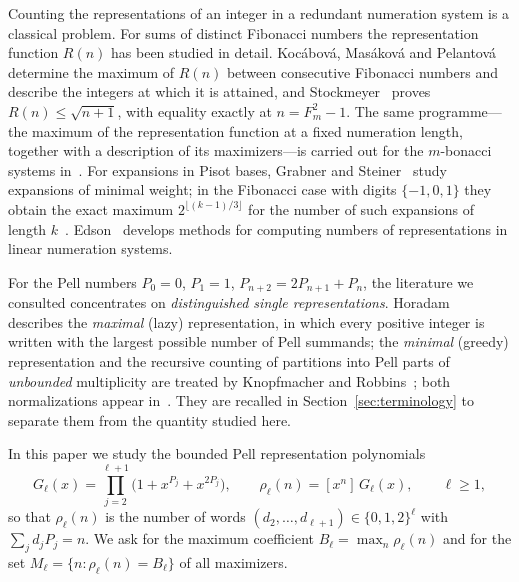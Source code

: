 \documentclass[11pt]{amsart}
\theoremstyle{definition}
\theoremstyle{remark}
\theoremstyle{plain}
\numberwithin{equation}{section}
\newcommand{\floor}[1]{\lfloor #1\rfloor}
\begin{document}
Counting the representations of an integer in a redundant numeration system is a classical problem.
For sums of distinct Fibonacci numbers the representation function $R(n)$ has been studied in
detail. Koc\'abov\'a, Mas\'akov\'a and Pelantov\'a~\cite{KMP2005} determine the maximum of $R(n)$
between consecutive Fibonacci numbers and describe the integers at which it is attained, and
Stockmeyer~\cite{Stockmeyer2009} proves $R(n)\le\sqrt{n+1}$, with equality exactly at
$n=F_m^2-1$. The same programme---the maximum of the representation function at a fixed numeration
length, together with a description of its maximizers---is carried out for the $m$-bonacci systems
in~\cite{KMP2007}. For expansions in Pisot bases, Grabner and Steiner~\cite{GrabnerSteiner2011}
study expansions of minimal weight; in the Fibonacci case with digits $\{-1,0,1\}$ they obtain the
exact maximum $2^{\floor{(k-1)/3}}$ for the number of such expansions of length
$k$~\cite[Theorem~4.6]{GrabnerSteiner2011}. Edson~\cite{Edson2013} develops methods for computing
numbers of representations in linear numeration systems.

For the Pell numbers $P_0=0$, $P_1=1$, $P_{n+2}=2P_{n+1}+P_n$, the literature we consulted
concentrates on \emph{distinguished single representations}. Horadam~\cite{Horadam1994} describes the
\emph{maximal} (lazy) representation, in which every positive integer is written with the largest
possible number of Pell summands; the \emph{minimal} (greedy) representation and the recursive
counting of partitions into Pell parts of \emph{unbounded} multiplicity are treated by Knopfmacher
and Robbins~\cite{KnopfmacherRobbins2004}; both normalizations appear in~\cite{Horadam1996}. They are
recalled in Section~\ref{sec:terminology} to separate them from the quantity studied here.

In this paper we study the bounded Pell representation polynomials
\[
G_\ell(x)=\prod_{j=2}^{\ell+1}\bigl(1+x^{P_j}+x^{2P_j}\bigr),\qquad \rho_\ell(n)=[x^n]\,G_\ell(x),
\qquad \ell\ge1,
\]
so that $\rho_\ell(n)$ is the number of words $(d_2,\dots,d_{\ell+1})\in\{0,1,2\}^\ell$ with
$\sum_jd_jP_j=n$. We ask for the maximum coefficient $B_\ell=\max_n\rho_\ell(n)$ and for the set
$M_\ell=\{n:\rho_\ell(n)=B_\ell\}$ of all maximizers.
\end{document}
